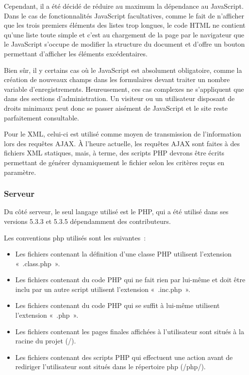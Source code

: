 \documentclass[letter, 11pt]{report}
\begin{document}
Cependant, il a été décidé de réduire au maximum la dépendance au JavaScript. Dans le cas de fonctionnalités JavaScript facultatives, comme le fait de n'afficher que les trois premiers éléments des listes trop longues, le code HTML ne contient qu'une liste toute simple et c'est au chargement de la page par le navigateur que le JavaScript s'occupe de modifier la structure du document et d'offre un bouton permettant d'afficher les éléments excédentaires.

Bien sûr, il y certains cas où le JavaScript est absolument obligatoire, comme la création de nouveaux champs dans les formulaires devant traiter un nombre variable d'enregistrements. Heureusement, ces cas complexes ne s'appliquent que dans des sections d'administration. Un visiteur ou un utilisateur disposant de droits minimaux peut donc se passer aisément de JavaScript et le site reste parfaitement consultable.

Pour le XML, celui-ci est utilisé comme moyen de transmission de l'information lors des requêtes AJAX. À l'heure actuelle, les requêtes AJAX sont faites à des fichiers XML statiques, mais, à terme, des scripts PHP devrons être écrits permettant de générer dynamiquement le fichier selon les critères reçus en paramètre.

\subsubsection{Serveur}
Du côté serveur, le seul langage utilisé est le PHP, qui a été utilisé dans ses versions 5.3.3 et 5.3.5 dépendamment des contributeurs.

Les conventions php utilisés sont les suivantes~:

\begin{itemize}
	\item Les fichiers contenant la définition d'une classe PHP utilisent l'extension «~.class.php~».
	\item Les fichiers contenant du code PHP qui ne fait rien par lui-même et doit être inclu par un autre script utilisent l'extension «~.inc.php~».
	\item Les fichiers contenant du code PHP qui se suffit à lui-même utilisent l'extension «~.php~».
	\item Les fichiers contenant les pages finales affichées à l'utilisateur sont situés à la racine du projet (/).
	\item Les fichiers contenant des scripts PHP qui effectuent une action avant de rediriger l'utilisateur sont situés dans le répertoire php (/php/).
\end{itemize}
\end{document}
